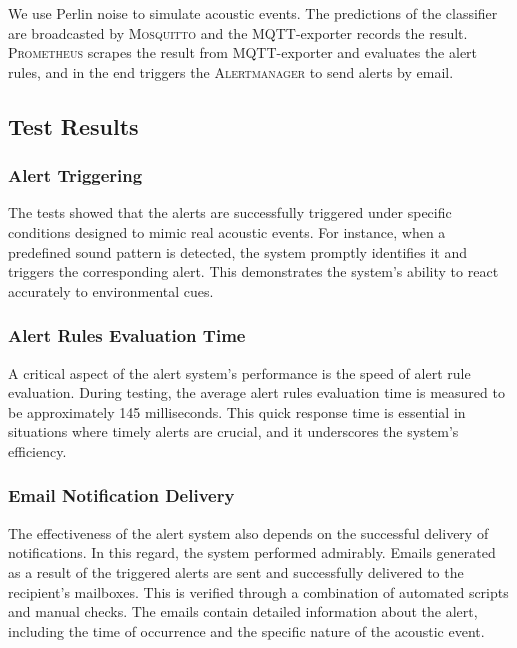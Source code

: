 We use Perlin noise to simulate acoustic events. The predictions of the classifier are broadcasted by \textsc{Mosquitto} and the MQTT-exporter records the result. \textsc{Prometheus} scrapes the result from MQTT-exporter and evaluates the alert rules, and in the end triggers the \textsc{Alertmanager} to send alerts by email.

\subsection{Test Results}
\subsubsection{Alert Triggering}
The tests showed that the alerts are successfully triggered under specific conditions designed to mimic real acoustic events. For instance, when a predefined sound pattern is detected, the system promptly identifies it and triggers the corresponding alert. This demonstrates the system's ability to react accurately to environmental cues.

\subsubsection{Alert Rules Evaluation Time}

A critical aspect of the alert system's performance is the speed of alert rule evaluation. During testing, the average alert rules evaluation time is measured to be approximately 145 milliseconds. This quick response time is essential in situations where timely alerts are crucial, and it underscores the system's efficiency.


\subsubsection{Email Notification Delivery}
The effectiveness of the alert system also depends on the successful delivery of notifications. In this regard, the system performed admirably. Emails generated as a result of the triggered alerts are sent and successfully delivered to the recipient's mailboxes. This is verified through a combination of automated scripts and manual checks. The emails contain detailed information about the alert, including the time of occurrence and the specific nature of the acoustic event.


